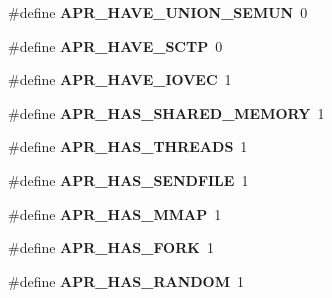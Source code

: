 \begin{DoxyCompactItemize}
\item 
\hypertarget{group__apr__platform_ga40fd92f709fa181dee59734f4564ead1}{\#define {\bfseries A\-P\-R\-\_\-\-H\-A\-V\-E\-\_\-\-U\-N\-I\-O\-N\-\_\-\-S\-E\-M\-U\-N}~0}\label{group__apr__platform_ga40fd92f709fa181dee59734f4564ead1}

\item 
\hypertarget{group__apr__platform_ga06b60866b89f9881de1022d193a7f126}{\#define {\bfseries A\-P\-R\-\_\-\-H\-A\-V\-E\-\_\-\-S\-C\-T\-P}~0}\label{group__apr__platform_ga06b60866b89f9881de1022d193a7f126}

\item 
\hypertarget{group__apr__platform_gafb25c8af133971c391c18193e67a5f4f}{\#define {\bfseries A\-P\-R\-\_\-\-H\-A\-V\-E\-\_\-\-I\-O\-V\-E\-C}~1}\label{group__apr__platform_gafb25c8af133971c391c18193e67a5f4f}

\item 
\hypertarget{group__apr__platform_ga88684cc5f8a23bc2cd6a4b63e5943e05}{\#define {\bfseries A\-P\-R\-\_\-\-H\-A\-S\-\_\-\-S\-H\-A\-R\-E\-D\-\_\-\-M\-E\-M\-O\-R\-Y}~1}\label{group__apr__platform_ga88684cc5f8a23bc2cd6a4b63e5943e05}

\item 
\hypertarget{group__apr__platform_ga8f98cbf61cd2ac1fada71fe486b04a34}{\#define {\bfseries A\-P\-R\-\_\-\-H\-A\-S\-\_\-\-T\-H\-R\-E\-A\-D\-S}~1}\label{group__apr__platform_ga8f98cbf61cd2ac1fada71fe486b04a34}

\item 
\hypertarget{group__apr__platform_ga653f9e26ef4064c7daaad1bb126b5d1f}{\#define {\bfseries A\-P\-R\-\_\-\-H\-A\-S\-\_\-\-S\-E\-N\-D\-F\-I\-L\-E}~1}\label{group__apr__platform_ga653f9e26ef4064c7daaad1bb126b5d1f}

\item 
\hypertarget{group__apr__platform_ga4f63ee64cebd015823f922c7ff98eadf}{\#define {\bfseries A\-P\-R\-\_\-\-H\-A\-S\-\_\-\-M\-M\-A\-P}~1}\label{group__apr__platform_ga4f63ee64cebd015823f922c7ff98eadf}

\item 
\hypertarget{group__apr__platform_ga3261ef06837fa5dc1a0164f7b0f16fab}{\#define {\bfseries A\-P\-R\-\_\-\-H\-A\-S\-\_\-\-F\-O\-R\-K}~1}\label{group__apr__platform_ga3261ef06837fa5dc1a0164f7b0f16fab}

\item 
\hypertarget{group__apr__platform_ga1a277e1905ab841d2979eff95816f8fb}{\#define {\bfseries A\-P\-R\-\_\-\-H\-A\-S\-\_\-\-R\-A\-N\-D\-O\-M}~1}\label{group__apr__platform_ga1a277e1905ab841d2979eff95816f8fb}


\end{DoxyCompactItemize}
